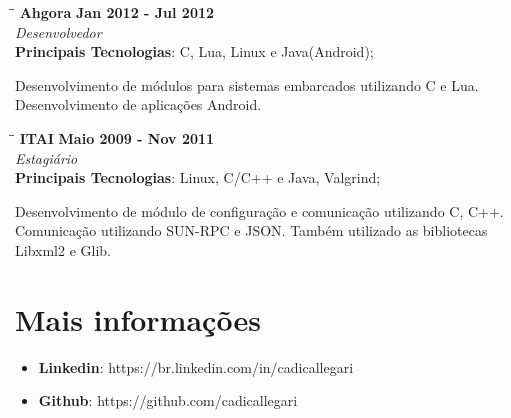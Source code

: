 \documentclass[margin]{res}
\begin{document}
\begin{resume}
   \begin{tabbing}
   \hspace{2.3in}\= \hspace{1.5in}\= \kill %
    \textbf{Ahgora}    \>\>\textbf{Jan 2012 - Jul 2012}\\
    \textit{Desenvolvedor}\\
    \textbf{Principais Tecnologias}: C, Lua, Linux e Java(Android);
   \end{tabbing}\vspace{-20pt}      %
    \vspace{2mm}
    
       Desenvolvimento de módulos para sistemas embarcados utilizando C e Lua. Desenvolvimento de aplicações Android.

   \begin{tabbing}
   \hspace{2.3in}\= \hspace{1.5in}\= \kill %
    \textbf{ITAI}    \>\>\textbf{Maio 2009 - Nov 2011}\\
    \textit{Estagiário}\\
    \textbf{Principais Tecnologias}: Linux, C/C++ e Java, Valgrind;
   \end{tabbing}\vspace{-20pt}      %
    \vspace{2mm}
       Desenvolvimento de módulo de configuração e comunicação utilizando C, C++. Comunicação utilizando SUN-RPC e JSON. Também utilizado as bibliotecas Libxml2 e Glib.


\section{Mais informações}
    \begin{itemize}
        \item \textbf{Linkedin}: https://br.linkedin.com/in/cadicallegari
        \item \textbf{Github}: https://github.com/cadicallegari
    \end{itemize}


\end{resume}
\end{document}
